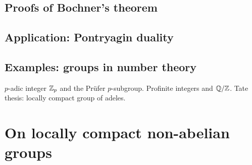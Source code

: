 \documentclass[12pt]{article}
\begin{document}
\subsection{Proofs of Bochner's theorem}
\subsection{Application: Pontryagin duality}
\subsection{Examples: groups in number theory}
$p$-adic integer $\mathbb{Z}_p$ and the Pr\"ufer $p$-subgroup.
Profinite integers and $\mathbb{Q}/\mathbb{Z}$.
Tate thesis: locally compact group of adeles.



\section{On locally compact non-abelian groups}





\end{document}
